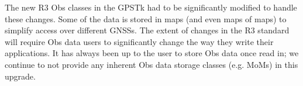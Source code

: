 The new R3 Obs classes in the GPSTk had to be significantly modified
to handle these changes.  Some of the data is stored in maps (and even
maps of maps) to simplify access over different GNSSs.  The extent of
changes in the R3 standard will require Obs data users to
significantly change the way they write their applications.  It has
always been up to the user to store Obs data once read in; we continue
to not provide any inherent Obs data storage classes (e.g. MoMs) in
this upgrade.

